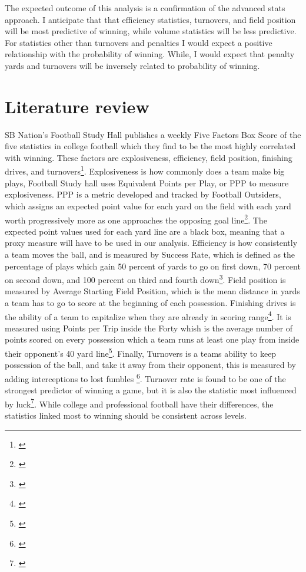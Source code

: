 \documentclass[12pt,english]{article}
\begin{document}
The expected outcome of this analysis is a confirmation of the advanced stats approach.  I anticipate that that efficiency statistics, turnovers, and field position will be most predictive of winning, while volume statistics will be less predictive.  For statistics other than turnovers and penalties I would expect a positive relationship with the probability of winning.  While, I would expect that penalty yards and turnovers will be inversely related to probability of winning.  

\section{Literature review}
SB Nation's Football Study Hall publishes a weekly Five Factors Box Score of the five statistics in college football which they find to be the most highly correlated with winning.  These factors are explosiveness, efficiency, field position, finishing drives, and turnovers\footnote{\citet{Con14}}. Explosiveness is how commonly does a team make big plays, Football Study hall uses Equivalent Points per Play, or PPP to measure explosiveness.  PPP is a metric developed and tracked by Football Outsiders, which assigns an expected point value for each yard on the field with each yard worth progressively more as one approaches the opposing goal line\footnote{\cite{FBO18}}. The expected point values used for each yard line are a black box, meaning that a proxy measure will have to be used in our analysis.  Efficiency is how consistently a team moves the ball, and is measured by Success Rate, which is defined as the percentage of plays which gain 50 percent of yards to go on first down, 70 percent on second down, and 100 percent on third and fourth down\footnote{\cite{FBO18}}.  Field position is measured by Average Starting Field Position, which is the mean distance in yards a team has to go to score at the beginning of each possession.  Finishing drives is the ability of a team to capitalize when they are already in scoring range\footnote{\citet{Con14}}.  It is measured using Points per Trip inside the Forty whish is the average number of points scored on every possession which a team runs at least one play from inside their opponent's 40 yard line\footnote{\cite{FBO18}}.  Finally, Turnovers is a teams ability to keep possession of the ball, and take it away from their opponent, this is measured by adding interceptions to lost fumbles \footnote{\citet{Con14}}.  Turnover rate is found to be one of the strongest predictor of winning a game, but it is also the statistic most influenced by luck\footnote{\citet{Con14}}.  While college and professional football have their differences, the statistics linked most to winning should be consistent across levels.  
\end{document}
